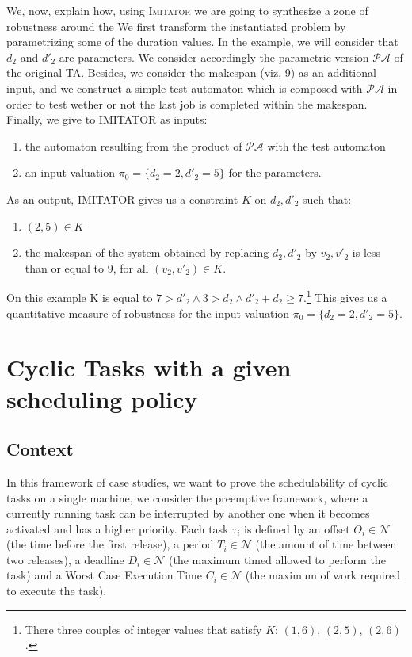 \documentclass{article}
\newcommand{\imitator}{\textsc{Imitator}}
\begin{document}
We, now, explain how, using \imitator{} we are going to synthesize a zone of robustness around the 
We first transform the instantiated problem by parametrizing some of the duration values. In the example, we will consider that $d_2$ and $d'_2$ are parameters. We consider accordingly
 the parametric version $\mathcal{PA}$ of the original TA. Besides, we consider the makespan (viz, 9) as an additional input, and we construct a simple test automaton which is composed with $\mathcal{PA}$ in order to test wether or not the 
last job is completed within the makespan.
Finally, we give to IMITATOR as inputs:
\begin{enumerate}
 \item  the automaton resulting from the product of $\mathcal{PA}$ with the test automaton
 \item  an input valuation $\pi_0 = \{d_2=2, d'_2 = 5\}$ for the parameters.
\end{enumerate}
As an output, IMITATOR gives us a constraint $K$ on $d_2, d'_2$ such that: 
\begin{enumerate}
 \item $(2,5) \in K$
 \item the makespan of the system obtained by replacing $d_2, d'_2$ by $v_2, v'_2$ is less than or equal to 9, for all $(v_2,v'_2) \in K$.
\end{enumerate}
On this example K is equal to $ 7 > d'_2 \wedge 3 > d_2 \wedge d'_2 + d_2 \geq 7$.\footnote{There three couples of integer values that satisfy $K$: $(1,6)$, $(2,5)$, $(2,6)$.} This gives us a quantitative
 measure of robustness for the input valuation $\pi_0 = \{d_2=2, d'_2 = 5\}$.

\section{Cyclic Tasks with a given scheduling policy}
\label{sec:fp-edf}
\subsection{Context}
In this framework of case studies, we want to prove the schedulability of cyclic tasks on a single machine, we consider the preemptive framework, where a currently running task
can be interrupted by another one when it becomes activated and has a higher priority. Each task $\tau_i$ is defined by an offset $O_i \in \mathcal{N}$ (the time before the first release), 
a period $T_i \in \mathcal{N}$ (the amount of time between two releases), a deadline $D_i \in \mathcal{N} $ (the maximum timed allowed to perform the task) and a Worst Case Execution Time $C_i \in \mathcal{N}$ (the maximum of work required to 
execute the task).
\end{document}
